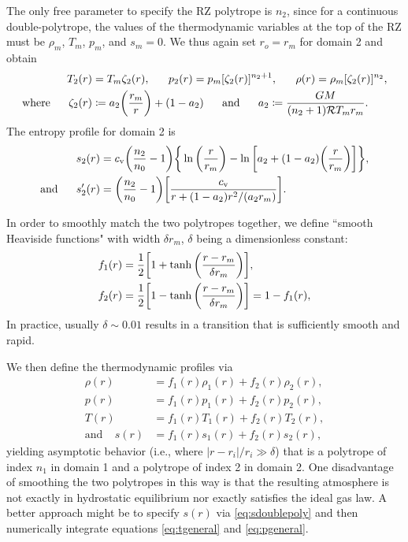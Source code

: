 \documentclass[12pt]{article} %
\newcommand{\cv}{c_{\rm{v}}}
\newcommand{\andd}{\text{and}\ \ \ \ \ }
\newcommand{\five}{\ \ \ \ \ }
\begin{document}
The only free parameter to specify the RZ polytrope is $n_2$, since for a continuous double-polytrope, the values of the thermodynamic variables at the top of the RZ must be $\rho_m$, $T_m$, $p_m$, and $s_m=0$. We thus again set $r_o=r_m$ for domain 2 and obtain
\begin{align}
T_2(r) &= T_m\zeta_2(r), \five p_2(r) = p_m[\zeta_2(r)]^{n_2+1}, \five \rho(r) = \rho_m[\zeta_2(r)]^{n_2},\label{eq:poly2}\\
\text{where}\five \zeta_2(r)&\coloneqq a_2\bigg{(}\frac{r_m}{r}\bigg{)} + (1-a_2)\five\andd a_2\coloneqq \frac{GM}{(n_2+1)\mathcal{R}T_mr_m}.
\end{align}
The entropy profile for domain 2 is 
\begin{align}
s_2(r) &= \cv\bigg{(}\frac{n_2}{n_0} - 1\bigg{)}\bigg{\{}\ln{\bigg{(}\frac{r}{r_m}\bigg{)}} - \ln{\bigg{[}a_2+(1-a_2)\bigg{(}\frac{r}{r_m}\bigg{)}\bigg{]}}\bigg{\}},\nonumber\\
\andd  s_2^\prime(r) &= \bigg{(}\frac{n_2}{n_0} - 1\bigg{)}\bigg{[}\frac{\cv}{r+(1-a_2)r^2/(a_2r_m)}\bigg{]}.
\end{align}

In order to smoothly match the two polytropes together, we define ``smooth Heaviside functions" with width $\delta r_m$, $\delta$ being a dimensionless constant:
\begin{align}
f_1(r) &= \frac{1}{2}\bigg{[}1+\tanh{\bigg{(}\frac{r - r_m}{\delta r_m}\bigg{)}}\bigg{]},\\
f_2(r) &= \frac{1}{2}\bigg{[}1-\tanh{\bigg{(}\frac{r - r_m}{\delta r_m}\bigg{)}}\bigg{]} = 1 - f_1(r),
\end{align}
In practice, usually $\delta \sim 0.01$ results in a transition that is sufficiently smooth and rapid. 

We then define the thermodynamic profiles via
\begin{subequations}
	\begin{align}
	\rho(r) &= f_1(r)\rho_1(r) + f_2(r)\rho_2(r),\\
	p(r) &= f_1(r)p_1(r) + f_2(r)p_2(r),\\
	T(r) &= f_1(r)T_1(r) + f_2(r)T_2(r),\\
	\andd s(r) &= f_1(r)s_1(r) + f_2(r)s_2(r)\label{eq:sdoublepoly},
	\end{align}
\end{subequations}
yielding asymptotic behavior (i.e., where $|r-r_i|/r_i \gg \delta$) that is a polytrope of index $n_1$ in domain 1 and a polytrope of index 2 in domain 2. One disadvantage of smoothing the two polytropes in this way is that the resulting atmosphere is not exactly in hydrostatic equilibrium nor exactly satisfies the ideal gas law. A better approach might be to specify $s(r)$ via \eqref{eq:sdoublepoly} and then numerically integrate equations \eqref{eq:tgeneral} and \eqref{eq:pgeneral}. 
\end{document}
